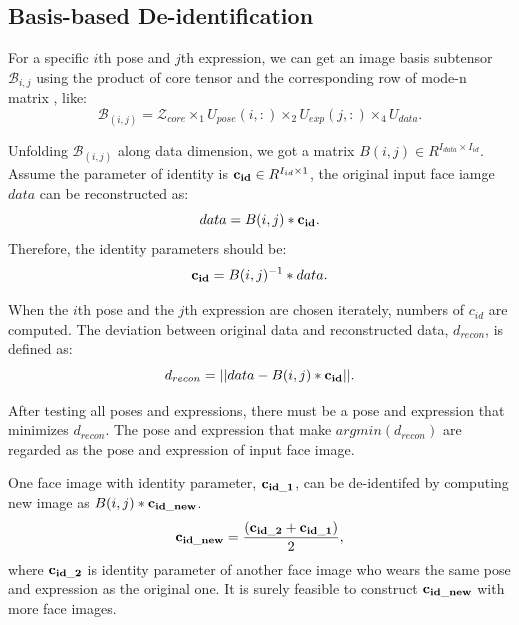 		\subsection{Basis-based De-identification}

				For a specific $i$th pose and $j$th expression, we can get an image basis subtensor $\mathcal{B}_{i,j}$ using the product of core tensor and the corresponding row of mode-n matrix \cite{TPAMI09}, like:
				\begin{equation}
					\mathcal{B}_{(i,j)} = \mathcal{Z}_{core} \times_1 U_{pose}(i,:) \times_2 U_{exp}(j,:) \times_4 U_{data}.
				\end{equation}
				
				Unfolding $\mathcal{B}_{(i,j)}$ along data dimension, we got a matrix $B(i,j) \in R^{I_{data} \times I_{id}}$. Assume the parameter of identity is ${\bf c_{id}} \in R^{I_{id} \times 1}$, the original input face iamge $data$ can be reconstructed as:
				\begin{equation}
					data = B(i,j) * {\bf c_{id}}.
				\end{equation}
				Therefore, the identity parameters should be:
				\begin{equation}
					{\bf c_{id}} = B(i,j)^{-1} * data.
				\end{equation}

				When the $i$th pose and the $j$th expression are chosen iterately, numbers of {\bf $c_{id}$} are computed. The deviation between original data and reconstructed data, $d_{recon}$, is defined as:
					\begin{equation}
						d_{recon} = ||data - B(i,j)*{\bf c_{id}}||.
						\label{deviation_ij}
					\end{equation}

				After testing all poses and expressions, there must be a pose and expression that minimizes $d_{recon}$. The pose and expression that make $argmin(d_{recon})$ are regarded as the pose and expression of input face image.  

				One face image with identity parameter, ${\bf c_{id\_1}}$, can be de-identifed by computing new image as $B(i,j)*{\bf c_{id\_new}}$. 
				\begin{equation}
					{\bf c_{id\_new}} = \frac{ ({\bf c_{id\_2}} + {\bf c_{id\_1}})}{2},
				\end{equation}
				where ${\bf c_{id\_2}}$ is identity parameter of another face image who wears the same pose and expression as the original one. It is surely feasible to construct ${\bf c_{id\_new}}$ with more face images. 


